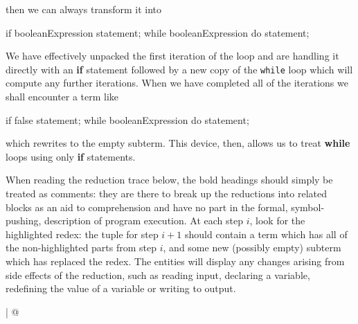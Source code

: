 \documentclass[11pt]{book}
\begin{document}
then we can always transform it into

\begin{codeblock}
if booleanExpression { statement; while booleanExpression do statement; }
\end{codeblock}

We have effectively unpacked the first iteration of the loop and are handling it directly with an {\bf if} statement followed by a new copy of the {\tt while} loop which will compute any further iterations. When we have completed all of the iterations we shall encounter a term like

\begin{codeblock}
if false { statement; while booleanExpression do statement; }
\end{codeblock}
which rewrites to the empty subterm. This device, then, allows us to treat {\bf while} loops using only {\bf if} statements.

When reading the reduction trace below, the bold headings should simply be treated as comments: they are there to break up the reductions into related blocks as an aid to comprehension and have no part in the formal, symbol-pushing, description of program execution. At each step $i$, look for the highlighted redex: the tuple for step $i+1$ should contain a term which has all of the non-highlighted parts from step $i$, and some new (possibly empty) subterm which has replaced the redex. The entities will display any changes arising from side effects of the reduction, such as reading input, declaring a variable, redefining the value of a variable or writing to output.

\label{reduction:trace}
\lstMakeShortInline[language=Java,columns=fullflexible,basewidth=0.51em,basicstyle=\color{BlueViolet}\sffamily]|
\lstMakeShortInline[language=Java,columns=fullflexible,basewidth=0.51em,basicstyle=\color{BrickRed}\sffamily]@
\end{document}
